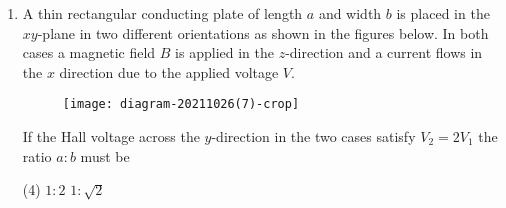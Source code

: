 \begin{enumerate}
	(In the following $B$ is the constant)
	{}
	\begin{tasks}(2)
		\task[\textbf{A.}] Proportional to $\cos \left(B-\frac{e E}{\hbar} a t\right)$
		\task[\textbf{B.}] Proportional to $E$
		\task[\textbf{C.}] Independent of $E$
		\task[\textbf{D.}] Proportional to $\sin \left(B-\frac{e E}{\hbar}\right.$ at $)$
	\end{tasks}
	\begin{answer}
		\begin{align*}
		\intertext{In the presence of electric field E , we can write}
		\vec{F}&=-e \vec{E} \Rightarrow \frac{d \vec{p}}{d t}=-e \vec{E} \Rightarrow \hbar \frac{d k}{d t}=-e E\\
		\text{Integration gives, }k(t)&=k(0)-\frac{e E}{\hbar} t\\
		\text{The group velocity }v&=\frac{d \omega}{d k}=\frac{1}{\hbar} \frac{\partial \varepsilon(k)}{d k}\\
		\text{	Since, }\varepsilon(k)&=\mu-\gamma \cos (k a), \qquad \therefore \quad \frac{\partial \varepsilon(k)}{\partial k}=\gamma a \sin k a\\
		\text{Thus, }v&=\frac{\gamma a}{\hbar} \sin (k a)
		\intertext{Time dependent velocity of electron is}
		v(t)&=\frac{\gamma a}{\hbar} \sin [k(t) a]=\frac{\gamma a}{\hbar} \sin \left[\left(k(0)-\frac{e E}{\hbar} t\right) a\right]\\
		&=\frac{\gamma a}{\hbar} \sin \left[k(0) a-\frac{e E}{\hbar} a t\right] \Rightarrow v(t)=\frac{\gamma a}{\hbar} \sin \left[B-\frac{e E}{\hbar} a t\right]
		\end{align*}
		So the correct answer is \textbf{Option (D)}
	\end{answer}
	\item  A thin rectangular conducting plate of length $a$ and width $b$ is placed in the $x y$-plane in two different orientations as shown in the figures below. In both cases a magnetic field $B$ is applied in the $z$-direction and a current flows in the $x$ direction due to the applied voltage $V$.\\
	\begin{figure}[H]
		\centering
		\texttt{[image: diagram-20211026(7)-crop]}
	\end{figure}
	If the Hall voltage across the $y$-direction in the two cases satisfy $V_{2}=2 V_{1}$ the ratio $a: b$ must be
	{}
	\begin{tasks}(4)
		\task[\textbf{A.}]  $1: 2$
		\task[\textbf{B.}] $1: \sqrt{2}$

\end{tasks}
\end{enumerate}
